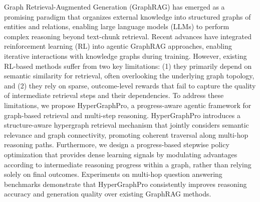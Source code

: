 Graph Retrieval-Augmented Generation (GraphRAG) has emerged as a promising paradigm that organizes external knowledge into structured graphs of entities and relations, enabling large language models (LLMs) to perform complex reasoning beyond text-chunk retrieval.
Recent advances have integrated reinforcement learning (RL) into agentic GraphRAG approaches, enabling iterative interactions with knowledge graphs during training.
However, existing RL-based methods suffer from two key limitations: (1) they primarily depend on semantic similarity for retrieval, often overlooking the underlying graph topology, and 
(2) they rely on sparse, outcome-level rewards that fail to capture the quality of intermediate retrieval steps and their dependencies.
To address these limitations, we propose HyperGraphPro, a progress-aware agentic framework for graph-based retrieval and multi-step reasoning. 
HyperGraphPro introduces a structure-aware hypergraph retrieval mechanism that jointly considers semantic relevance and graph connectivity, promoting coherent traversal along multi-hop reasoning paths.
Furthermore, we design a progress-based stepwise policy optimization that provides dense learning signals by modulating advantages according to intermediate reasoning progress within a graph, rather than relying solely on final outcomes.
Experiments on multi-hop question answering benchmarks demonstrate that HyperGraphPro consistently improves reasoning accuracy and generation quality over existing GraphRAG methods.